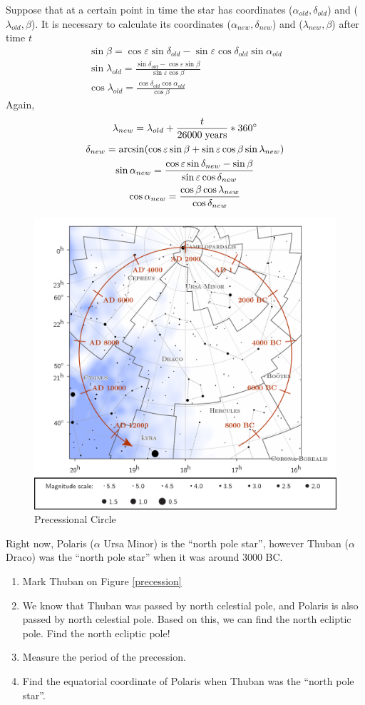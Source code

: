 \documentclass[a4paper,12pt]{extarticle}
\begin{document}
Suppose that at a certain point in time the star has coordinates ($\alpha_{old}, \delta_{old}$) and ($\lambda_{old}, \beta$). It is necessary to calculate its coordinates ($\alpha_{new}, \delta_{new}$) and ($\lambda_{new}, \beta$) after time $t$ 
\begin{gather*}
	\sin\beta=\cos\varepsilon \sin\delta_{old}-\sin\varepsilon\cos\delta_{old}\sin\alpha_{old}\\
	\sin\lambda_{old}=\frac{\sin\delta_{old}-\cos\varepsilon \sin\beta}{\sin\varepsilon \cos\beta}\\
	\cos\lambda_{old}=\frac{\cos\delta_{old}\cos\alpha_{old}}{\cos\beta}
\end{gather*}
Again, 
\begin{gather*}
	\lambda_{new}=\lambda_{old}+\frac{t}{26000\;\rm years}\ast 360^\circ\\
	\delta_{new}=\arcsin(\cos\varepsilon\sin\beta+\sin\varepsilon\cos\beta \sin\lambda_{new})\\
	\sin\alpha_{new}=\frac{\cos\varepsilon\sin\delta_{new}-\sin\beta}{\sin\varepsilon\cos\delta_{new}}\\
	\cos\alpha_{new}=\frac{\cos\beta\cos\lambda_{new}}{\cos\delta_{new}}
\end{gather*}

\begin{figure}[H]
	\centering
	\includegraphics[width=0.7 \linewidth]{presc1.png}
	\caption{Precessional Circle}
	\label{pcircle}
\end{figure}
Right now, Polaris ($\alpha$ Ursa Minor) is the ``north pole star'', however Thuban ($\alpha$ Draco) was the ``north pole star'' when it was around 3000 BC.

\begin{enumerate}[Q1.]
	\item Mark Thuban on Figure \ref{precession}
	\item We know that Thuban was passed by north celestial pole, and Polaris is also passed by north celestial pole. Based on this, we can find the north ecliptic pole. Find the north ecliptic pole!
	\item Measure the period of the precession.
	\item Find the equatorial coordinate of Polaris when Thuban was the ``north pole star''.
\end{enumerate}
\end{document}

